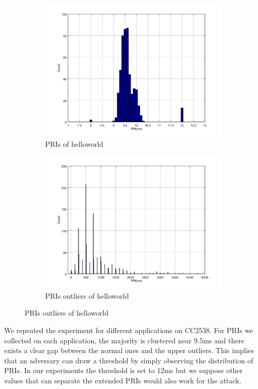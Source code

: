 \begin{figure}[!h]
	\centering
	\begin{subfigure}{0.45\textwidth}
		\includegraphics[width=\textwidth]{fig/helloworld_cc2538.png}
		\caption{PRIs of helloworld\label{HelloworldPri}}
	\end{subfigure}
	\begin{subfigure}{0.45\textwidth}
		\includegraphics[width=\textwidth]{fig/helloworld_cc2538_outlier.png}
		\caption{PRIs outliers of helloworld\label{HelloworldPriOutliers}}
	\end{subfigure}
\end{figure}

We repeated the experiment for different applications on CC2538. For PRIs we collected on each application, the majority is clustered near 9.5ms and there exists a clear gap between the normal ones and the upper outliers. This implies that an adversary can draw a threshold by simply observing the distribution of PRIs. In our experiments the threshold is set to 12ms but we suppose other values that can separate the extended PRIs would also work for the attack.

